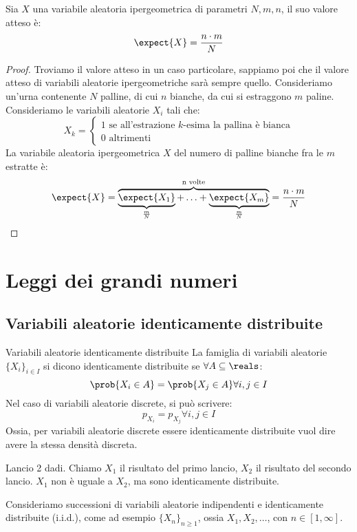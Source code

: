 \begin{fact}
Sia $X$ una variabile aleatoria ipergeometrica di parametri $N, m, n$, il suo valore atteso \`e:
\[
\expect{X} = \frac{n \cdot m}{N}
\]
\end{fact}

\begin{proof}
Troviamo il valore atteso in un caso particolare, sappiamo poi che il valore atteso di variabili aleatorie ipergeometriche sar\`a sempre quello. Consideriamo un'urna contenente $N$ palline, di cui $n$ bianche, da cui si estraggono $m$ paline. Consideriamo le variabili aleatorie $X_i$ tali che:
\[
X_k = 
\begin{cases}
1 \text{ se all'estrazione $k$-esima la pallina \`e bianca} \\
0 \text{ altrimenti}
\end{cases}
\]
La variabile aleatoria ipergeometrica $X$ del numero di palline bianche fra le $m$ estratte \`e:
\[
\expect{X} = \overbrace{\underbrace{\expect{X_1}}_{\frac{m}{N}} + \ldots + \underbrace{\expect{X_m}}_{\frac{m}{N}}}^{\text{n volte}} =
\frac{n \cdot m}{N}
\]
\end{proof}

\section{Leggi dei grandi numeri}

\subsection{Variabili aleatorie identicamente distribuite}

\begin{defn}{Variabili aleatorie identicamente distribuite}
La famiglia di variabili aleatorie $\{X_i\}_{i \in I}$ si dicono identicamente distribuite se $\forall A \subseteq \reals$:
\[
\prob{X_i \in A} = \prob{X_j \in A} \forall i, j \in I
\]
Nel caso di variabili aleatorie discrete, si pu\`o scrivere:
\[
p_{X_i} = p_{X_j} \forall i, j \in I
\]
Ossia, per variabili aleatorie discrete essere identicamente distribuite vuol dire avere la stessa densit\`a discreta.
\end{defn}
\begin{exmp}
Lancio 2 dadi. Chiamo $X_1$ il risultato del primo lancio, $X_2$ il risultato del secondo lancio. $X_1$ non \`e uguale a $X_2$, ma sono identicamente distribuite.
\end{exmp}

Consideriamo successioni di variabili aleatorie indipendenti e identicamente distribuite (i.i.d.), come ad esempio $\{ X_n \}_{n \ge 1}$, ossia $X_1, X_2, \ldots$, con $n \in [1, \infty]$.

